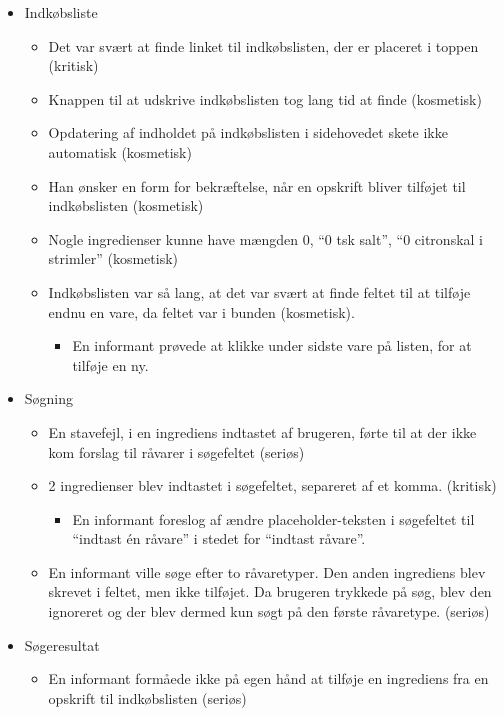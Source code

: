  \begin{itemize}[noitemsep]
 \item Indkøbsliste
  \begin{itemize}[noitemsep]
  \item Det var svært at finde linket til indkøbslisten, der er placeret i toppen (kritisk)
  \item Knappen til at udskrive indkøbslisten tog lang tid at finde (kosmetisk)
  \item Opdatering af indholdet på indkøbslisten i sidehovedet skete ikke automatisk (kosmetisk)
  \item Han ønsker en form for bekræftelse, når en opskrift bliver tilføjet til indkøbslisten (kosmetisk)
  \item Nogle ingredienser kunne have mængden 0, \fx “0 tsk salt”, “0 citronskal i strimler” (kosmetisk)
  \item Indkøbslisten var så lang, at det var svært at finde feltet til at tilføje endnu en vare, da feltet var i bunden (kosmetisk).
   \begin{itemize}[noitemsep]
   \item En informant prøvede at klikke under sidste vare på listen, for at tilføje en ny.
   \end{itemize}
  \end{itemize}
 \item Søgning
  \begin{itemize}[noitemsep]
  \item En stavefejl, i en ingrediens indtastet af brugeren, førte til at der ikke kom forslag til råvarer i søgefeltet (seriøs)
  \item 2 ingredienser blev indtastet i søgefeltet, separeret af et komma. (kritisk)
   \begin{itemize}[noitemsep]
   \item En informant foreslog af ændre placeholder-teksten i søgefeltet til ``indtast én råvare'' i stedet for ``indtast råvare''.
   \end{itemize}
  \item En informant ville søge efter to råvaretyper. Den anden ingrediens blev skrevet i feltet, men ikke tilføjet. Da brugeren trykkede på søg, blev den ignoreret og der blev dermed kun søgt på den første råvaretype. (seriøs)
  \end{itemize}
 \item Søgeresultat
   \begin{itemize}[noitemsep]
  \item En informant formåede ikke på egen hånd at tilføje en ingrediens fra en opskrift til indkøbslisten (seriøs)

\end{itemize}
\end{itemize}
